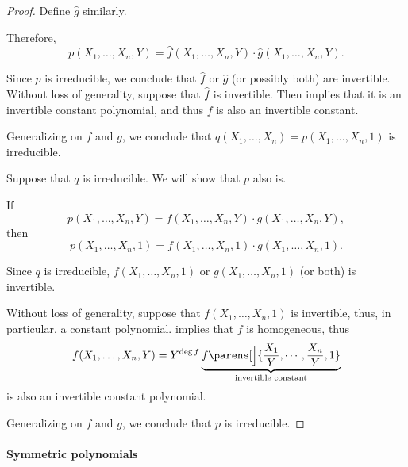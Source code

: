 \begin{proof}
  Define \( \widehat{g} \) similarly.

  Therefore,
  \begin{equation*}
    p(X_1, \ldots, X_n, Y) = \widehat f(X_1, \ldots, X_n, Y) \cdot \widehat g(X_1, \ldots, X_n, Y).
  \end{equation*}

  Since \( p \) is irreducible, we conclude that \( \widehat{f} \) or \( \widehat{g} \) (or possibly both) are invertible. Without loss of generality, suppose that \( \widehat{f} \) is invertible. Then  implies that it is an invertible constant polynomial, and thus \( f \) is also an invertible constant.

  Generalizing on \( f \) and \( g \), we conclude that \( q(X_1, \ldots, X_n) = p(X_1, \ldots, X_n, 1) \) is irreducible.

  \NecessitySubProof Suppose that \( q \) is irreducible. We will show that \( p \) also is.

  If
  \begin{equation*}
    p(X_1, \ldots, X_n, Y) = f(X_1, \ldots, X_n, Y) \cdot g(X_1, \ldots, X_n, Y),
  \end{equation*}
  then
  \begin{equation*}
    p(X_1, \ldots, X_n, 1) = f(X_1, \ldots, X_n, 1) \cdot g(X_1, \ldots, X_n, 1).
  \end{equation*}

  Since \( q \) is irreducible, \( f(X_1, \ldots, X_n, 1) \) or \( g(X_1, \ldots, X_n, 1) \) (or both) is invertible.

  Without loss of generality, suppose that \( f(X_1, \ldots, X_n, 1) \) is invertible, thus, in particular, a constant polynomial.  implies that \( f \) is homogeneous, thus
  \begin{equation*}
    f(X_1, \ldots, X_n, Y) = Y^{\deg f} \underbrace{f\parens[\Big]{ \frac {X_1} Y, \cdots, \frac {X_n} Y, 1 }}_{\T{invertible constant}}
  \end{equation*}
  is also an invertible constant polynomial.

  Generalizing on \( f \) and \( g \), we conclude that \( p \) is irreducible.
\end{proof}

\paragraph{Symmetric polynomials}

